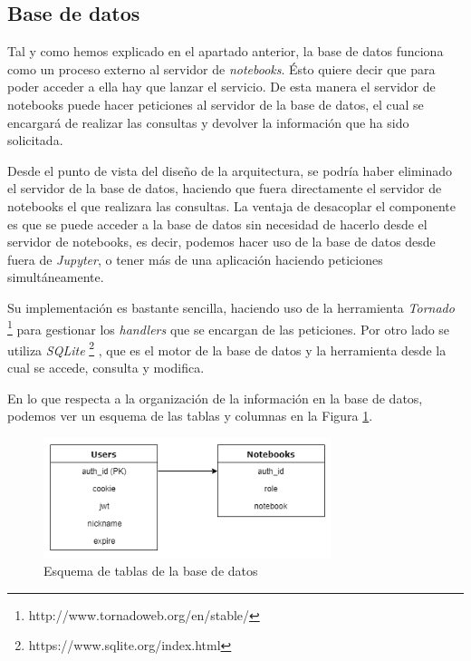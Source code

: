\documentclass[11pt,spanish,listoffigures,listoftables]{tfgetsinf}
\begin{document}
\subsection{Base de datos}
\label{subsec:diseno-bd}

Tal y como hemos explicado en el apartado anterior, la base de datos funciona como un proceso externo al servidor de \textit{notebooks}. Ésto quiere decir que para poder acceder a ella hay que lanzar el servicio. De esta manera el servidor de notebooks puede hacer peticiones al servidor de la base de datos, el cual se encargará de realizar las consultas y devolver la información que ha sido solicitada. 

Desde el punto de vista del diseño de la arquitectura, se podría haber eliminado el servidor de la base de datos, haciendo que fuera directamente el servidor de notebooks el que realizara las consultas. La ventaja de desacoplar el componente es que se puede acceder a la base de datos sin necesidad de hacerlo desde el servidor de notebooks, es decir, podemos hacer uso de la base de datos desde fuera de \textit{Jupyter}, o tener más de una aplicación haciendo peticiones simultáneamente. 

Su implementación es bastante sencilla, haciendo uso de la herramienta \textit{Tornado}  \footnote{http://www.tornadoweb.org/en/stable/} para gestionar los \textit{handlers} que se encargan de las peticiones. Por otro lado se utiliza \textit{SQLite} \footnote{https://www.sqlite.org/index.html} , que es el motor de la base de datos y la herramienta desde la cual se accede, consulta y modifica. 

En lo que respecta a la organización de la información en la base de datos, podemos ver un esquema de las tablas y columnas en la Figura \ref{fig:db-scheme}. 

\begin{figure}[h]
	\centering
  	\includegraphics[width=0.75\textwidth]{database.png}
  	\caption{Esquema de tablas de la base de datos}
  	\label{fig:db-scheme}
\end{figure}
\end{document}

